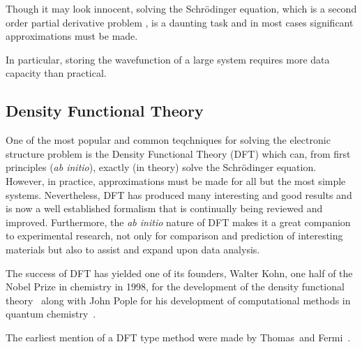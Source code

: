 Though it may look innocent, solving the Schr\"odinger equation, which is a second order partial derivative problem , is a daunting task and in most cases significant approximations must be made.

\bit
\item In particular, storing the wavefunction of a large system requires more data capacity than practical.
\eit

\subsection{Density Functional Theory}
\label{sec:methods-dft}
One of the most popular and common teqchniques for solving the electronic structure problem is the Density Functional Theory (DFT) which can, from first principles (\textit{ab initio}), exactly (in theory) solve the Schr\"odinger equation.
However, in practice, approximations must be made for all but the most simple systems.
Nevertheless, DFT has produced many interesting and good results and is now a well established formalism that is continually being reviewed and improved.
Furthermore, the \textit{ab initio} nature of DFT makes it a great companion to experimental research, not only for comparison and prediction of interesting materials but also to assist and expand upon data analysis.

The success of DFT has yielded one of its founders, Walter Kohn, one half of the Nobel Prize in chemistry in 1998, for the development of the density functional theory~\cite{kohn1999} along with John Pople for his development of computational methods in quantum chemistry~\cite{pople1999}.

\bit
\item The earliest mention of a DFT type method were made by Thomas~\citemiss and Fermi~\citemiss.
\eit

